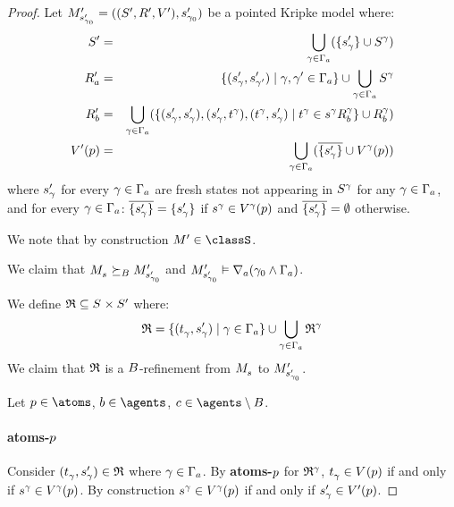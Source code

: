 \begin{proof}
Let $\kPModelAndTupleP{\kStateSP_{\gamma_0}}$ be a pointed Kripke model where:
\begin{eqnarray*}
    \kStatesP &=& \bigcup_{\gamma \in \Gamma_\agentA} (\{\kStateSP_\gamma\} \cup \kStates[\gamma])\\
    \kAccessibilityPA &=& \{(\kStateSP_\gamma, \kStateSP_{\gamma'}) \mid \gamma, \gamma' \in \Gamma_\agentA\} \cup \bigcup_{\gamma \in \Gamma_\agentA} \kStates[\gamma]\\
    \kAccessibilityPB &=& \bigcup_{\gamma \in \Gamma_\agentA} (\{(\kStateSP_\gamma, \kStateSP_\gamma), (\kStateSP_\gamma, \kStateT[\gamma]), (\kStateT[\gamma], \kStateSP_\gamma) \mid \kStateT[\gamma] \in \kSuccessorsB[\gamma]{\kStateS[\gamma]}\} \cup \kAccessibilityB[\gamma])\\
    \kValuationP(\atomP) &=& \bigcup_{\gamma \in \Gamma_\agentA} (\overline{\{\kStateSP_\gamma\}} \cup \kValuation[\gamma](\atomP))
\end{eqnarray*}
where $\kStateSP_\gamma$ for every $\gamma \in \Gamma_\agentA$ are fresh states not appearing in $\kStates[\gamma]$ for any $\gamma \in \Gamma_\agentA$, and for every $\gamma \in \Gamma_\agentA$: $\overline{\{\kStateSP_\gamma\}} = \{\kStateSP_\gamma\}$ if $\kStateS[\gamma] \in \kValuation[\gamma](\atomP)$ and $\overline{\{\kStateSP_\gamma\}} = \emptyset$ otherwise.

We note that by construction $\kModelP \in \classS$.

We claim that $\kPModel{\kStateS} \simulatesBs \kPModelP{\kStateSP_{\gamma_0}}$ and $\kPModelP{\kStateSP_{\gamma_0}} \entails \coversA (\gamma_0 \land \Gamma_\agentA)$.

We define $\refinement \subseteq \kStates \times \kStatesP$ where:
$$
\refinement = \{(\kStateT_\gamma, \kStateSP_\gamma) \mid \gamma \in \Gamma_\agentA\} \cup \bigcup_{\gamma \in \Gamma_\agentA} \refinement^\gamma
$$
We claim that $\refinement$ is a $\agentsB$-refinement from $\kPModel{\kStateS}$ to $\kPModelP{\kStateSP_{\gamma_0}}$.

Let $\atomP \in \atoms$, $\agentB \in \agents$, $\agentC \in \agents \setminus \agentsB$.

\paragraph{atoms-$\atomP$}
Consider $(\kStateT_\gamma, \kStateSP_\gamma) \in \refinement$ where $\gamma \in \Gamma_\agentA$.
By {\bf atoms-$\atomP$} for $\refinement^\gamma$, $\kStateT_\gamma \in \kValuation(\atomP)$ if and only if $\kStateS[\gamma] \in \kValuation[\gamma](\atomP)$.
By construction $\kStateS[\gamma] \in \kValuation[\gamma](\atomP)$ if and only if $\kStateSP_\gamma \in \kValuationP(\atomP)$.


\end{proof}
